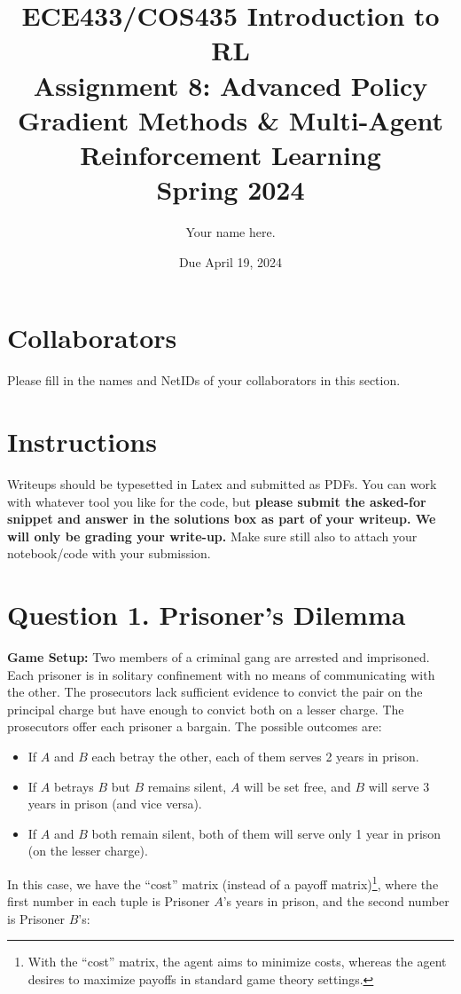 \documentclass[12pt]{article}
\date{Due April 19, 2024}
\author{\begin{fillme}[width=0.3\textwidth]
 Your name here.
\end{fillme}} %
\title{ECE433/COS435 Introduction to RL\\
  Assignment 8: Advanced Policy Gradient Methods \& Multi-Agent Reinforcement Learning\\
  Spring 2024\\
}
\begin{document}
  \maketitle
  \section*{Collaborators}
\begin{fillme}
 Please fill in the names and NetIDs of your collaborators in this section.
\end{fillme}

\section*{Instructions}

Writeups should be typesetted in Latex and submitted as PDFs. You can work with whatever tool you like for the code, but \textbf{please submit the asked-for snippet and answer in the solutions box as part of your writeup. We will only be grading your write-up.} Make sure still also to attach your notebook/code with your submission.\\


\section*{Question 1. Prisoner's Dilemma}
\textbf{Game Setup:}
Two members of a criminal gang are arrested and imprisoned. Each prisoner is in solitary confinement with no means of communicating with the other. The prosecutors lack sufficient evidence to convict the pair on the principal charge but have enough to convict both on a lesser charge. The prosecutors offer each prisoner a bargain. The possible outcomes are:

\begin{itemize}
    \item If $A$ and $B$ each betray the other, each of them serves 2 years in prison.
    \item If $A$ betrays $B$ but $B$ remains silent, $A$ will be set free, and $B$ will serve 3 years in prison (and vice versa).
    \item If $A$ and $B$ both remain silent, both of them will serve only 1 year in prison (on the lesser charge).
\end{itemize}

In this case, we have the ``cost'' matrix (instead of a payoff matrix)\footnote{With the ``cost'' matrix, the agent aims to minimize costs, whereas the agent desires to maximize payoffs in standard game theory settings.}, where the first number in each tuple is Prisoner $A$'s years in prison, and the second number is Prisoner $B$'s:
\end{document}
